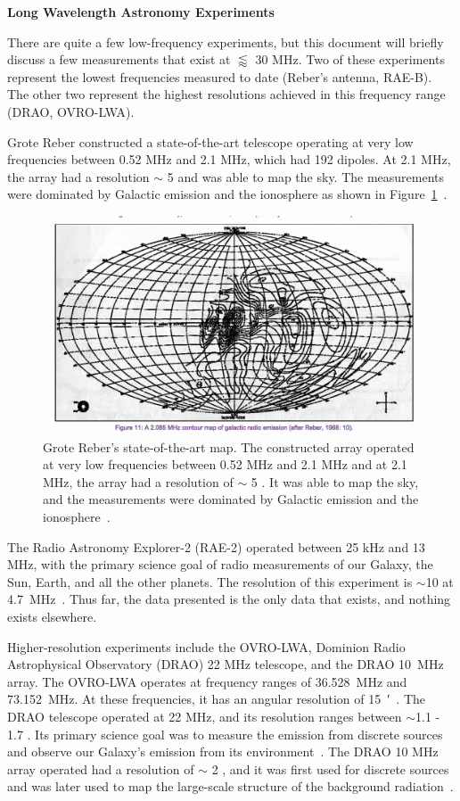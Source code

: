 {\bf{Long Wavelength Astronomy Experiments}}

There are quite a few low-frequency experiments, but this document will briefly discuss a few measurements that exist at $\lessapprox$ 30 MHz. Two of these experiments represent the lowest frequencies measured to date (Reber's antenna, RAE-B). The other two represent the highest resolutions achieved in this frequency range (DRAO, OVRO-LWA).

Grote Reber constructed a state-of-the-art telescope operating at very low frequencies between 0.52 MHz and 2.1 MHz, which had 192 dipoles. At 2.1 MHz, the array had a resolution $\sim$ 5 \degree and was able to map the sky. The measurements were dominated by Galactic emission and the ionosphere as shown in Figure~\ref{Fig:Rebermap}~\citep{1988JRASC..82...93R}. 

\begin{figure}
	\centering
	\includegraphics[width=0.7\linewidth]{Figures/Rebermap}
	\caption{Grote Reber's state-of-the-art map. The constructed array operated at very low frequencies between 0.52 MHz and 2.1 MHz and at 2.1 MHz, the array had a resolution of $\sim$ 5 \degree. It was able to map the sky, and the measurements were dominated by Galactic emission and the ionosphere~\citep{1988JRASC..82...93R}.}
	\label{Fig:Rebermap}
\end{figure}

The Radio Astronomy Explorer-2 (RAE-2) operated between 25 kHz and 13 MHz, with the primary science goal of radio measurements of our Galaxy, the Sun, Earth, and all the other planets. The resolution of this experiment is $\sim$10 \degree at \SI{4.7}{\mega\hertz}~\citep{1975A&A....40..365A}. Thus far, the data presented is the only data that exists, and nothing exists elsewhere.

Higher-resolution experiments include the OVRO-LWA, Dominion Radio Astrophysical Observatory (DRAO) 22 MHz telescope, and the DRAO \SI{10}{\mega\hertz} array. The OVRO-LWA operates at frequency ranges of \SI{36.528}{\mega\hertz} and \SI{73.152}{\mega\hertz}. At these frequencies, it has an angular resolution of \SI{15}{\arcminute}~\citep{2018AJ....156...32E}. The DRAO telescope operated at 22 MHz, and its resolution ranges between $\sim$1.1 \degree - 1.7 \degree. Its primary science goal was to measure the emission from discrete sources and observe our Galaxy's emission from its environment~\citep{1999A&AS..137....7R}. The DRAO 10 MHz array operated had a resolution of $\sim$ 2  \degree, and it was first used for discrete sources and was later used to map the large-scale structure of the background radiation~\citep{1976MNRAS.177..601C}.

